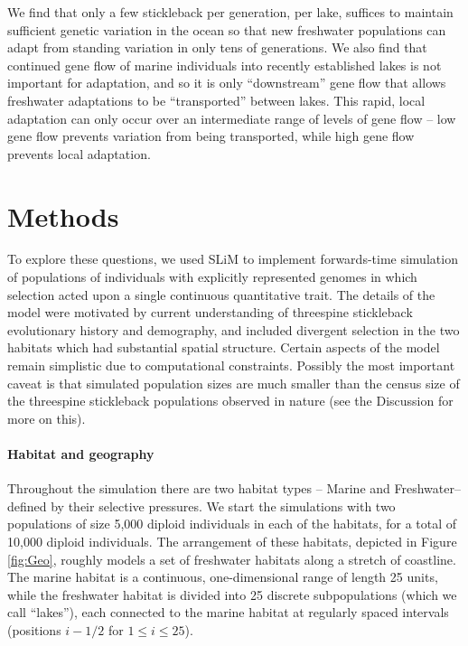 \documentclass{article}
\begin{document}
We find that only a few stickleback per generation, per lake, 
suffices to maintain sufficient genetic variation in the ocean
so that new freshwater populations can adapt from standing variation in only tens of generations.
We also find that continued gene flow of marine individuals into recently established lakes
is not important for adaptation,
and so it is only ``downstream'' gene flow that allows freshwater adaptations to be ``transported'' between lakes.
This rapid, local adaptation can only occur over an intermediate range of levels of gene flow --
low gene flow prevents variation from being transported,
while high gene flow prevents local adaptation.


\section*{Methods}

To explore these questions, we used SLiM \citep{haller2017slim,haller2018slim3} 
to implement forwards-time simulation of populations of individuals with explicitly represented genomes
in which selection acted upon a single continuous quantitative trait.
The details of the model were motivated by current understanding of threespine stickleback evolutionary history and demography,
and included divergent selection in the two habitats which had substantial spatial structure.
Certain aspects of the model remain simplistic due to computational constraints.
Possibly the most important caveat is that simulated population sizes 
are much smaller than the census size of the threespine stickleback populations observed in nature
(see the Discussion for more on this).

\paragraph{Habitat and geography}
Throughout the simulation there are two habitat types -- Marine and Freshwater-- defined by their selective pressures.
We start the simulations with two populations of size 5,000 diploid individuals in each of the habitats, for a total of 10,000 diploid individuals.
The arrangement of these habitats, depicted in Figure \ref{fig:Geo},
roughly models a set of freshwater habitats along a stretch of coastline. 
The marine habitat is a continuous, one-dimensional range of length 25 units,
while the freshwater habitat is divided into 25 discrete subpopulations (which we call ``lakes''),
each connected to the marine habitat at regularly spaced intervals
(positions $i - 1/2$ for $1 \le i \le 25$).
\end{document}
